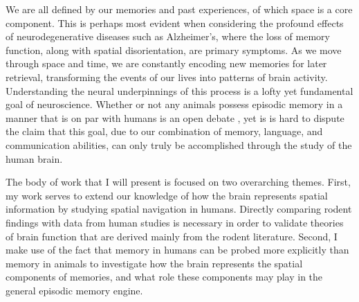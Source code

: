 We are all defined by our memories and past experiences, of which space is a core component. This is perhaps most evident when considering the profound effects of neurodegenerative diseases such as Alzheimer's, where the loss of memory function, along with spatial disorientation, are primary symptoms. As we move through space and time, we are constantly encoding new memories for later retrieval, transforming the events of our lives into patterns of brain activity. Understanding the neural underpinnings of this process is a lofty yet fundamental goal of neuroscience.
Whether or not any animals possess episodic memory in a manner that is on par with humans is an open debate \citep{ClayEtal03}, yet is is hard to dispute the claim that this goal, due to our combination of memory, language, and communication abilities, can only truly be accomplished through the study of the human brain.

The body of work that I will present is focused on two overarching themes. First, my work serves to extend our knowledge of how the brain represents spatial information by studying spatial navigation in humans. Directly comparing rodent findings with data from human studies is necessary in order to validate theories of brain function that are derived mainly from the rodent literature. Second, I make use of the fact that memory in humans can be probed more explicitly than memory in animals to investigate how the brain represents the spatial components of memories, and what role these components may play in the general episodic memory engine.

